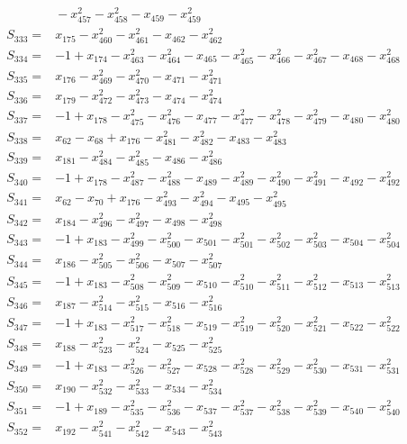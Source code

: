 \begin{align*}
&{}-x_{457}^{2}-x_{458}^{2}-x_{459}-x_{459}^{2}\\[3pt]
S_{333}={}&x_{175}-x_{460}^{2}-x_{461}^{2}-x_{462}-x_{462}^{2}\\[3pt]
S_{334}={}&-1+x_{174}-x_{463}^{2}-x_{464}^{2}-x_{465}-x_{465}^{2}-x_{466}^{2}-x_{467}^{2}-x_{468}-x_{468}^{2}\\[3pt]
S_{335}={}&x_{176}-x_{469}^{2}-x_{470}^{2}-x_{471}-x_{471}^{2}\\[3pt]
S_{336}={}&x_{179}-x_{472}^{2}-x_{473}^{2}-x_{474}-x_{474}^{2}\\[3pt]
S_{337}={}&-1+x_{178}-x_{475}^{2}-x_{476}^{2}-x_{477}-x_{477}^{2}-x_{478}^{2}-x_{479}^{2}-x_{480}-x_{480}^{2}\\[3pt]
S_{338}={}&x_{62}-x_{68}+x_{176}-x_{481}^{2}-x_{482}^{2}-x_{483}-x_{483}^{2}\\[3pt]
S_{339}={}&x_{181}-x_{484}^{2}-x_{485}^{2}-x_{486}-x_{486}^{2}\\[3pt]
S_{340}={}&-1+x_{178}-x_{487}^{2}-x_{488}^{2}-x_{489}-x_{489}^{2}-x_{490}^{2}-x_{491}^{2}-x_{492}-x_{492}^{2}\\[3pt]
S_{341}={}&x_{62}-x_{70}+x_{176}-x_{493}^{2}-x_{494}^{2}-x_{495}-x_{495}^{2}\\[3pt]
S_{342}={}&x_{184}-x_{496}^{2}-x_{497}^{2}-x_{498}-x_{498}^{2}\\[3pt]
S_{343}={}&-1+x_{183}-x_{499}^{2}-x_{500}^{2}-x_{501}-x_{501}^{2}-x_{502}^{2}-x_{503}^{2}-x_{504}-x_{504}^{2}\\[3pt]
S_{344}={}&x_{186}-x_{505}^{2}-x_{506}^{2}-x_{507}-x_{507}^{2}\\[3pt]
S_{345}={}&-1+x_{183}-x_{508}^{2}-x_{509}^{2}-x_{510}-x_{510}^{2}-x_{511}^{2}-x_{512}^{2}-x_{513}-x_{513}^{2}\\[3pt]
S_{346}={}&x_{187}-x_{514}^{2}-x_{515}^{2}-x_{516}-x_{516}^{2}\\[3pt]
S_{347}={}&-1+x_{183}-x_{517}^{2}-x_{518}^{2}-x_{519}-x_{519}^{2}-x_{520}^{2}-x_{521}^{2}-x_{522}-x_{522}^{2}\\[3pt]
S_{348}={}&x_{188}-x_{523}^{2}-x_{524}^{2}-x_{525}-x_{525}^{2}\\[3pt]
S_{349}={}&-1+x_{183}-x_{526}^{2}-x_{527}^{2}-x_{528}-x_{528}^{2}-x_{529}^{2}-x_{530}^{2}-x_{531}-x_{531}^{2}\\[3pt]
S_{350}={}&x_{190}-x_{532}^{2}-x_{533}^{2}-x_{534}-x_{534}^{2}\\[3pt]
S_{351}={}&-1+x_{189}-x_{535}^{2}-x_{536}^{2}-x_{537}-x_{537}^{2}-x_{538}^{2}-x_{539}^{2}-x_{540}-x_{540}^{2}\\[3pt]
S_{352}={}&x_{192}-x_{541}^{2}-x_{542}^{2}-x_{543}-x_{543}^{2}\\[3pt]

\end{align*}
